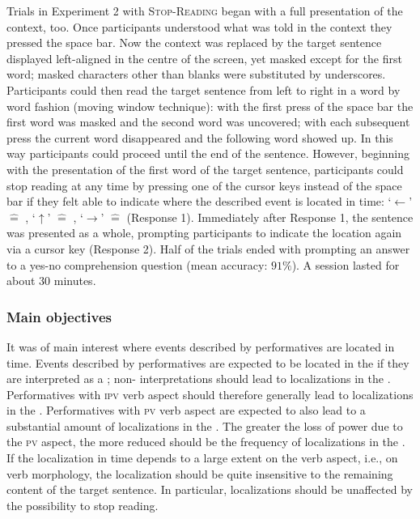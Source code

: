 \documentclass[output=paper,colorlinks,citecolor=brown,newtxmath,hidelinks]{langscibook}
\begin{document}
Trials in Experiment 2 with \textsc{Stop-Reading} began with a full presentation of the context, too. Once participants understood what was told in the context they pressed the space bar. Now the context was replaced by the target sentence displayed left-aligned in the centre of the screen, yet masked except for the first word; masked characters other than blanks were substituted by underscores. Participants could then read the target sentence from left to right in a word by word fashion (moving window technique): with the first press of the space bar the first word was masked and the second word was uncovered; with each subsequent press the current word disappeared and the following word showed up. In this way participants could proceed until the end of the sentence. However, beginning with the presentation of the first word of the target sentence, participants could stop reading at any time by pressing one of the cursor keys instead of the space bar if they felt able to indicate where the described event is located in time: ‘$\leftarrow$’ $\hat{=}$ , ‘$\uparrow$’ $\hat{=}$ , ‘$\rightarrow$’ $\hat{=}$  (Response 1). Immediately after Response 1, the sentence was presented as a whole, prompting participants to indicate the location again via a cursor key (Response 2). Half of the trials ended with prompting an answer to a yes-no comprehension question (mean accuracy: $91\%$). A session lasted for about 30 minutes. 

\subsubsection{Main objectives}

It was of main interest where events described by performatives are located in time. Events described by performatives are expected to be located in the  if they are interpreted as a ; non- interpretations should lead to localizations in the . Performatives with \textsc{ipv} verb aspect should therefore generally lead to localizations in the . Performatives with \textsc{pv} verb aspect are expected to also lead to a substantial amount of localizations in the . The greater the loss of  power due to the \textsc{pv} aspect, the more reduced should be the frequency of localizations in the . If the localization in time depends to a large extent on the verb aspect, i.e., on verb morphology, the localization should be quite insensitive to the remaining content of the target sentence. In particular, localizations should be unaffected by the possibility to stop reading.
\end{document}
